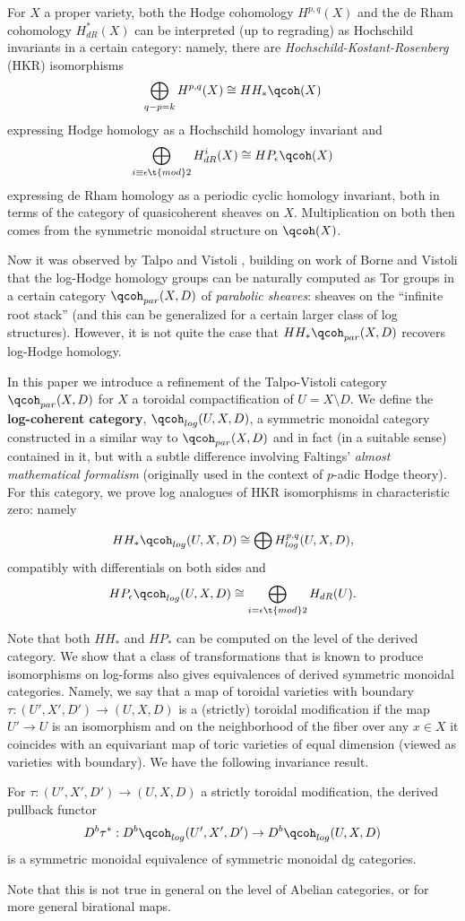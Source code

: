 \documentclass{article}
\begin{document}
For $X$ a proper variety, both the Hodge cohomology $H^{p, q}(X)$ and the de Rham cohomology $H^*_{dR}(X)$ can be interpreted (up to regrading) as Hochschild invariants in a certain category: namely, there are \emph{Hochschild-Kostant-Rosenberg} (HKR) isomorphisms $$\bigoplus_{q-p = k}H^{p, q}(X)\cong HH_*\qcoh(X)$$ expressing Hodge homology as a Hochschild homology invariant and $$\bigoplus_{i \equiv \epsilon \t{ mod } 2} H^i_{dR}(X)\cong HP_\epsilon\qcoh(X)$$ expressing de Rham homology as a periodic cyclic homology invariant, both in terms of the category of quasicoherent sheaves on $X$. Multiplication on both then comes from the symmetric monoidal structure on $\qcoh(X)$. 

Now it was observed by Talpo and Vistoli \cite{talpo-vistoli}, building on work of Borne and Vistoli \cite{borne-vistoli} that the log-Hodge homology groups can be naturally computed as Tor groups in a certain category $\qcoh_{par}(X, D)$ of \emph{parabolic sheaves}: sheaves on the ``infinite root stack'' (and this can be generalized for a certain larger class of log structures). However, it is not quite the case that $HH_*\qcoh_{par}(X, D)$ recovers log-Hodge homology.

In this paper we introduce a refinement of the Talpo-Vistoli category $\qcoh_{par}(X, D)$ for $X$ a toroidal compactification of $U = X\setminus D$. We define the {\bf log-coherent category}, $\qcoh_{log}(U, X, D)$, a symmetric monoidal category constructed in a similar way to $\qcoh_{par}(X, D)$ and in fact (in a suitable sense) contained in it, but with a subtle difference involving Faltings' \emph{almost mathematical formalism} \cite{faltings} (originally used in the context of $p$-adic Hodge theory). For this category, we prove log analogues of HKR isomorphisms in characteristic zero: namely
\begin{thm}\label{formstheorem}
  $$HH_*\qcoh_{log}(U, X, D) \cong \bigoplus H^{p, q}_{log}(U, X, D),$$ compatibly with differentials on both sides and
  $$HP_\epsilon\qcoh_{log}(U, X, D) \cong \bigoplus_{i = \epsilon\t{ mod }2} H_{dR}(U).$$
\end{thm}
Note that both $HH_*$ and $HP_*$ can be computed on the level of the derived category. We show that a class of transformations that is known to produce isomorphisms on log-forms also gives equivalences of derived symmetric monoidal categories. Namely, we say that a map of toroidal varieties with boundary $\tau:(U', X', D')\to (U, X, D)$ is a (strictly) toroidal modification if the map $U'\to U$ is an isomorphism and on the neighborhood of the fiber over any $x\in X$ it coincides with an equivariant map of toric varieties of equal dimension (viewed as varieties with boundary). We have the following invariance result.
\begin{thm}\label{invariance}
  For $\tau: (U', X', D')\to (U, X, D)$ a strictly toroidal modification, the derived pullback functor $$D^b\tau^*:D^b\qcoh_{log}(U', X', D')\to D^b\qcoh_{log}(U, X, D)$$ is a symmetric monoidal equivalence of symmetric monoidal dg categories.
\end{thm}
\noindent Note that this is not true in general on the level of Abelian categories, or for more general birational maps.
\end{document}
